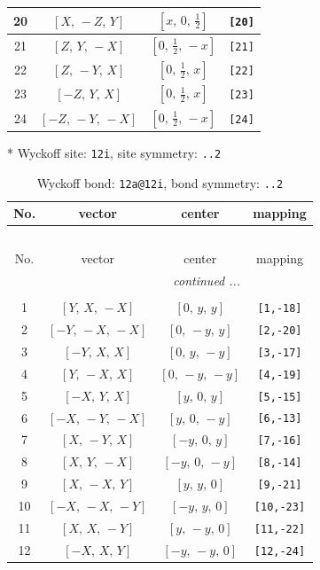 \documentclass[fleqn,8pt]{jsarticle}
\begin{document}
\begin{longtable}{cccc}
20 & $\left[ X,\, - Z,\, Y \right]$ & $\left[ x,\, 0,\, \frac{1}{2} \right]$ & {\tt [20]} \\ \hline
21 & $\left[ Z,\, Y,\, - X \right]$ & $\left[ 0,\, \frac{1}{2},\, - x \right]$ & {\tt [21]} \\ \hline
22 & $\left[ Z,\, - Y,\, X \right]$ & $\left[ 0,\, \frac{1}{2},\, x \right]$ & {\tt [22]} \\ \hline
23 & $\left[ - Z,\, Y,\, X \right]$ & $\left[ 0,\, \frac{1}{2},\, x \right]$ & {\tt [23]} \\ \hline
24 & $\left[ - Z,\, - Y,\, - X \right]$ & $\left[ 0,\, \frac{1}{2},\, - x \right]$ & {\tt [24]} \\
\end{longtable}
* Wyckoff site: {\tt 12i}, site symmetry: {\tt ..2}
\renewcommand{\arraystretch}{1.2}
\begin{longtable}{cccc}
\caption{Wyckoff bond: {\tt 12a@12i}, bond symmetry: {\tt ..2}}
 \\
 \hline \hline
No. & vector & center & mapping \\ \hline \endfirsthead

\multicolumn{3}{l}{\tablename\ \thetable{}} \\
 \hline \hline
No. & vector & center & mapping \\ \hline \endhead

 \hline \hline
\multicolumn{3}{r}{\footnotesize\it continued ...} \\ \endfoot

 \hline \hline
\multicolumn{3}{r}{} \\ \endlastfoot

1 & $\left[ Y,\, X,\, - X \right]$ & $\left[ 0,\, y,\, y \right]$ & {\tt [1,-18]} \\ \hline
2 & $\left[ - Y,\, - X,\, - X \right]$ & $\left[ 0,\, - y,\, y \right]$ & {\tt [2,-20]} \\ \hline
3 & $\left[ - Y,\, X,\, X \right]$ & $\left[ 0,\, y,\, - y \right]$ & {\tt [3,-17]} \\ \hline
4 & $\left[ Y,\, - X,\, X \right]$ & $\left[ 0,\, - y,\, - y \right]$ & {\tt [4,-19]} \\ \hline
5 & $\left[ - X,\, Y,\, X \right]$ & $\left[ y,\, 0,\, y \right]$ & {\tt [5,-15]} \\ \hline
6 & $\left[ - X,\, - Y,\, - X \right]$ & $\left[ y,\, 0,\, - y \right]$ & {\tt [6,-13]} \\ \hline
7 & $\left[ X,\, - Y,\, X \right]$ & $\left[ - y,\, 0,\, y \right]$ & {\tt [7,-16]} \\ \hline
8 & $\left[ X,\, Y,\, - X \right]$ & $\left[ - y,\, 0,\, - y \right]$ & {\tt [8,-14]} \\ \hline
9 & $\left[ X,\, - X,\, Y \right]$ & $\left[ y,\, y,\, 0 \right]$ & {\tt [9,-21]} \\ \hline
10 & $\left[ - X,\, - X,\, - Y \right]$ & $\left[ - y,\, y,\, 0 \right]$ & {\tt [10,-23]} \\ \hline
11 & $\left[ X,\, X,\, - Y \right]$ & $\left[ y,\, - y,\, 0 \right]$ & {\tt [11,-22]} \\ \hline
12 & $\left[ - X,\, X,\, Y \right]$ & $\left[ - y,\, - y,\, 0 \right]$ & {\tt [12,-24]} \\
\end{longtable}
\end{document}
